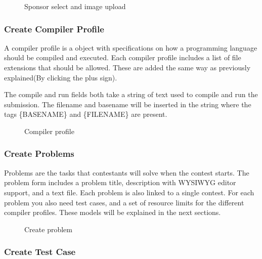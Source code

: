 \begin{figure}
\centering
 	\caption{Sponsor select and image upload}
 	\label{fig:sponsorUpload}
\end{figure}


\subsubsection{Create Compiler Profile}

A compiler profile is a object with specifications on how a programming
language should be compiled and executed. Each compiler profile
includes a list of file extensions that should be allowed. These are
added the same way as previously explained(By clicking the plus sign).

The compile and run fields both take a string of text used to compile
and run the submission. The filename and basename will be inserted in
the string where the tags \{BASENAME\} and \{FILENAME\} are present.

\begin{figure}
\centering
	\caption{Compiler profile}
	\label{fig:compilerProfile}
\end{figure}



\bigskip

\subsubsection{Create Problems}

Problems are the tasks that contestants will solve when the contest
starts. The problem form includes a problem title, description with
WYSIWYG editor support, and a text file. Each problem is also linked to
a single contest. For each problem you also need test cases, and a set
of resource limits for the different compiler profiles. These models
will be explained in the next sections.


\begin{figure}
\centering
	\caption{Create problem}
	\label{fig:problem}
\end{figure}

\subsubsection{Create Test Case}

